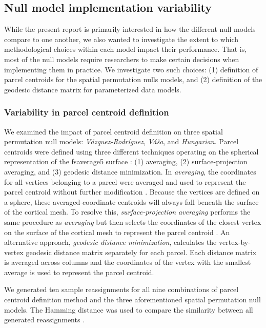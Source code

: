 \documentclass[12pt,aps,pra,reprint,showkeys]{revtex4-1}
\begin{document}
\subsection*{Null model implementation variability}

While the present report is primarily interested in how the different null models compare to one another, we also wanted to investigate the extent to which methodological choices within each model impact their performance.
That is, most of the null models require researchers to make certain decisions when implementing them in practice.
We investigate two such choices: (1) definition of parcel centroids for the spatial permutation nulls models, and (2) definition of the geodesic distance matrix for parameterized data models.

\subsubsection*{Variability in parcel centroid definition}

We examined the impact of parcel centroid definition on three spatial permutation null models: \textit{V{\'a}zquez-Rodr{\'i}guez}, \textit{V{\'a}{\v{s}}a}, and \textit{Hungarian}.
Parcel centroids were defined using three different techniques operating on the spherical representation of the fsaverage5 surface \citep{fischl1999humanbrainmap}: (1) averaging, (2) surface-projection averaging, and (3) geodesic distance minimization.
In \textit{averaging}, the coordinates for all vertices belonging to a parcel were averaged and used to represent the parcel centroid without further modification \citep{vasa2018cercor}.
Because the vertices are defined on a sphere, these averaged-coordinate centroids will always fall beneath the surface of the cortical mesh.
To resolve this, \textit{surface-projection averaging} performs the same procedure as \textit{averaging} but then selects the coordinates of the closest vertex on the surface of the cortical mesh to represent the parcel centroid \citep{vazquezrodriguez2019pnas}.
An alternative approach, \textit{geodesic distance minimization}, calculates the vertex-by-vertex geodesic distance matrix separately for each parcel.
Each distance matrix is averaged across columns and the coordinates of the vertex with the smallest average is used to represent the parcel centroid.

We generated ten sample reassignments for all nine combinations of parcel centroid definition method and the three aforementioned spatial permutation null models.
The Hamming distance was used to compare the similarity between all generated reassignments \citep{hamming1950distance}.
\end{document}

